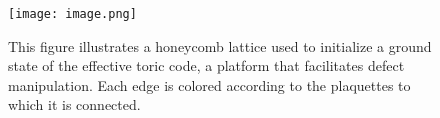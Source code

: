 \begin{figure}[h]
    \centering
    \texttt{[image: image.png]}
    \caption{This figure illustrates a honeycomb lattice used to initialize a ground state of the effective toric code, a platform that facilitates defect manipulation. Each edge is colored according to the plaquettes to which it is connected.}
    \label{fig:honeycomb_lattice}
\end{figure}